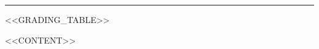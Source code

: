 \documentclass[<<FONTSIZE>>,<<PAPER>>paper]{article}
\newcommand{\wsgSubject}{<<SUBJECT>>}
\newcommand{\wsgTitle}{<<TITLE>>}
\newcommand{\wsgNumber}{<<NUMBER>>}
\newcommand{\wsgSchool}{<<SCHOOL>>}
\newcommand{\wsgClass}{<<CLASS>>}
\newcommand{\wsgTeacher}{<<TEACHER>>}
\newcommand{\wsgYear}{<<YEAR>>}
\newif\ifwsgSolutions   \wsgSolutions<<SOLUTIONS>>
\newif\ifwsgGraded      \wsgGraded<<GRADED>>
\newif\ifwsgCredentials \wsgCredentials<<CREDENTIALS>>
\newif\ifwsgNumbered    \wsgNumbered<<NUMBERED>>
\newcommand{\wsgLabelWorksheet}{Pracovní list}
\newcommand{\wsgLabelNo}{č.}
\newcommand{\wsgLabelSolutionSheet}{ŘEŠENÍ}
\newcommand{\wsgLabelName}{Jméno a příjmení}
\newcommand{\wsgLabelPoints}{Body}
\newcommand{\wsgLabelStarNote}{%
    Úlohy označené\ \wsgStarMark{1} jsou náročnější, úlohy označené\
    \wsgStarMark{2} rozšiřující.}
\newcommand{\wsgLabelWorksheet}{Worksheet}
\newcommand{\wsgLabelNo}{no.}
\newcommand{\wsgLabelSolutionSheet}{SOLUTIONS}
\newcommand{\wsgLabelName}{Name and surname}
\newcommand{\wsgLabelPoints}{Points}
\newcommand{\wsgLabelStarNote}{%
    Tasks marked\ \wsgStarMark{1} are harder, tasks marked\
    \wsgStarMark{2} go beyond the syllabus.}
\providecommand{\wsgTotalPoints}{?}
\providecommand{\wsgAnyStars}{false}
\newcommand{\wsgStarMark}[1]{%
  \textsuperscript{%
    \ifstrequal{#1}{1}{*}{\ifstrequal{#1}{2}{**}{#1}}%
  }%
}
\newcommand{\wsgMakeHeader}{%
  \ifboolexpr{bool{wsgNumbered} or not test{\ifdefempty{\wsgSchool}}}{%
    \noindent{\scriptsize\color{wsgMuted}%
      \ifwsgNumbered\MakeUppercase{\wsgLabelWorksheet\ \wsgLabelNo~\wsgNumber}\fi
      \ifdefempty{\wsgSchool}{}{\hfill\MakeUppercase{\wsgSchool}}}%
    \par\vspace{0.3em}%
  }{}%
  \noindent{\fontsize{22}{24}\selectfont\bfseries
    \ifdefempty{\wsgTitle}{\wsgSubject}{\wsgTitle}}%
  \par\vspace{0.4em}%
  \noindent\textcolor{wsgAccent}{\rule{\linewidth}{2pt}}%
  \par\vspace{0.35em}%
  \noindent{\scriptsize\color{wsgMuted}%
    \MakeUppercase{\wsgSubject}%
    \ifdefempty{\wsgClass}{}{\ \textbar\ \MakeUppercase{\wsgClass}}%
    \ifdefempty{\wsgTeacher}{}{\ \textbar\ \MakeUppercase{\wsgTeacher}}%
    \ifdefempty{\wsgYear}{}{\ \textbar\ \wsgYear}%
    \ifwsgSolutions\hfill{\bfseries\color{wsgSolution}\MakeUppercase{\wsgLabelSolutionSheet}}\fi}%
  \par\vspace{1.2em}%
  \ifwsgSolutions\else
    \ifboolexpr{bool{wsgCredentials} or bool{wsgGraded}}{%
      \noindent{\footnotesize
      \ifwsgCredentials
        \MakeUppercase{\wsgLabelName}~\textcolor{wsgRule}{\rule[-0.35em]{0.42\linewidth}{0.6pt}}%
      \fi
      \ifwsgGraded
        \hfill\MakeUppercase{\wsgLabelPoints}~\textcolor{wsgRule}{\rule[-0.35em]{1.5cm}{0.6pt}}\,/\,\wsgTotalPoints
      \fi}%
      \par\vspace{1.0em}%
    }{}%
  \fi
  <<GRADING_TABLE>>%
  \ifdefstring{\wsgAnyStars}{true}{%
    \noindent{\scriptsize\color{wsgMuted}\wsgLabelStarNote}\par\vspace{0.6em}%
  }{}%
}
\begin{document}
\wsgMakeHeader
<<CONTENT>>
\end{document}
